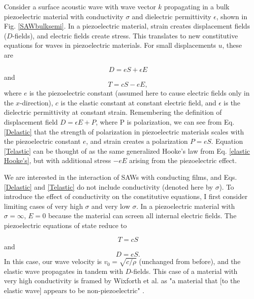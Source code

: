\documentclass[double,12pt,1in]{beavtex}
\begin{document}
Consider a surface acoustic wave with wave vector $k$ propagating in a bulk piezoelectric material with conductivity $\sigma$ and dielectric permittivity $\epsilon$, shown in Fig. \ref{SAWbulksemi}. In a piezoelectric material, strain creates displacement fields ($D$-fields), and electric fields create stress. This translates to new constitutive equations for waves in piezoelectric materials. For small displacements $u$, these are

\begin{equation} 
    D = eS + \epsilon E \label{Delastic}
\end{equation}
and
\begin{equation} 
    T = cS -eE, \label{Telastic}
\end{equation}
where $e$ is the piezoelectric constant (assumed here to cause electric fields only in the $x$-direction), $c$ is the elastic constant at constant electric field, and $\epsilon$ is the dielectric permittivity at constant strain. Remembering the definition of displacement field $D = \epsilon E + P$, where P is polarization, we can see from Eq. \ref{Delastic} that the strength of polarization in piezoelectric materials scales with the piezoelectric constant $e$, and strain creates a polarization $P = eS$. Equation \ref{Telastic} can be thought of as the same generalized Hooke's law from Eq. \ref{elastic Hooke's}, but with additional stress $-eE$ arising from the piezoelectric effect. 

We are interested in the interaction of SAWs with conducting films, and Eqs. \ref{Delastic} and \ref{Telastic} do not include conductivity (denoted here by $\sigma$). To introduce the effect of conductivity on the constitutive equations, I first consider limiting cases of very high $\sigma$ and very low $\sigma$. In a piezoelectric material with $\sigma = \infty$, $E = 0$ because the material can screen all internal electric fields. The piezoelectric equations of state reduce to 

\begin{equation}
    T = cS
\end{equation}
and
\begin{equation}
    D = eS.
\end{equation}
In this case, our wave velocity is $v_0 = \sqrt{c/\rho}$ (unchanged from before), and the elastic wave propagates in tandem with $D$-fields. This case of a material with very high conductivity is framed by Wixforth et al. as "a material that [to the elastic wave] appears to be non-piezoelectric" \cite{wixforth_surface_1989}.
\end{document}
